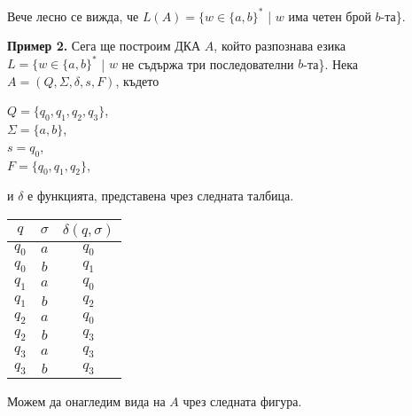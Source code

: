 \documentclass[openany]{book}
\begin{document}
    \vspace{5pt}

    Вече лесно се вижда, че $L(A) = \{w \in \{a,b\}^*$ | $w$ има четен брой $b$-та\}.

    \vspace{10pt}

    \textbf{Пример 2.} Сега ще построим ДКА $A$, който разпознава езика \\ $L = \{w \in \{a,b\}^*$ | $w$ не съдържа три последователни $b$-та\}.
    Нека \\ $A = (Q, \Sigma, \delta, s, F)$, където
    \begin{center}
        $Q = \{q_0, q_1, q_2, q_3\}$, \\
        $\Sigma = \{a,b\}$, \\
        $s = q_0$, \\
        $F = \{q_0, q_1, q_2\}$,
    \end{center}
    и $\delta$ е функцията, представена чрез следната талбица.

    \vspace{5pt} 

    \begin{center}
        \begin{tabular}{ c c c } 
         \hline
         $q$ & $\sigma$ & $\delta(q,\sigma)$ \\
         \hline 
         $q_0$ & $a$ & $q_0$ \\ 
         $q_0$ & $b$ & $q_1$ \\ 
         $q_1$ & $a$ & $q_0$ \\
         $q_1$ & $b$ & $q_2$ \\
         $q_2$ & $a$ & $q_0$ \\ 
         $q_2$ & $b$ & $q_3$ \\ 
         $q_3$ & $a$ & $q_3$ \\
         $q_3$ & $b$ & $q_3$ \\
         \hline
        \end{tabular}
    \end{center}
    
    \vspace{5pt}

    Можем да онагледим вида на $A$ чрез следната фигура.

    \vspace{5pt}
\end{document}
